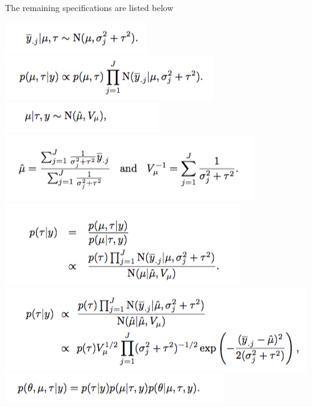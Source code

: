 \documentclass[a4paper, 9pt]{article}
\begin{document}
The remaining specifications are listed below
\begin{center}
    \includegraphics[scale = 0.55]{spec5.png}\\
    \includegraphics[scale = 0.55]{spec6.png}\\
    \includegraphics[scale = 0.55]{spec7.png}\\
    \includegraphics[scale = 0.55]{spec8.png}\\
    \includegraphics[scale = 0.55]{spec9.png}\\
    \includegraphics[scale = 0.55]{spec10.png}\\
    \includegraphics[scale = 0.55]{spec11.png}
\end{center}
\end{document}
